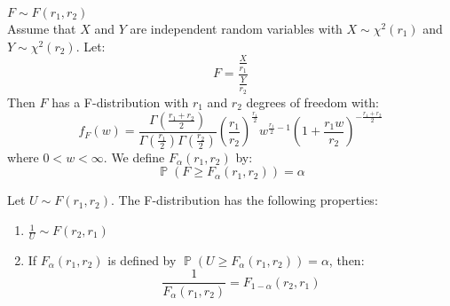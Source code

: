 \documentclass{huhtakm-template-book-v2}
\DeclareMathOperator{\prob}{\mathbb{P}}
\begin{document}
\newpage
\begin{eg} $F\sim F(r_{1},r_{2})$\\
	Assume that $X$ and $Y$ are independent random variables with $X\sim\chi^{2}(r_{1})$ and $Y\sim\chi^{2}(r_{2})$. Let:
	\begin{equation*}
		F=\frac{\frac{X}{r_{1}}}{\frac{Y}{r_{2}}}
	\end{equation*}
	Then $F$ has a F-distribution with $r_{1}$ and $r_{2}$ degrees of freedom with:
	\begin{equation*}
		f_{F}(w)=\frac{\Gamma\left(\frac{r_{1}+r_{2}}{2}\right)}{\Gamma\left(\frac{r_{1}}{2}\right)\Gamma\left(\frac{r_{2}}{2}\right)}\left(\frac{r_{1}}{r_{2}}\right)^{\frac{r_{1}}{2}}w^{\frac{r_{1}}{2}-1}\left(1+\frac{r_{1}w}{r_{2}}\right)^{-\frac{r_{1}+r_{2}}{2}}
	\end{equation*}
	where $0<w<\infty$. We define $F_{\alpha}(r_{1},r_{2})$ by:
	\begin{equation*}
		\prob(F\geq F_{\alpha}(r_{1},r_{2}))=\alpha
	\end{equation*}
\end{eg}
\begin{lem}
	Let $U\sim F(r_{1},r_{2})$. The F-distribution has the following properties:
	\begin{enumerate}
		\item $\frac{1}{U}\sim F(r_{2},r_{1})$
		\item If $F_{\alpha}(r_{1},r_{2})$ is defined by $\prob(U\geq F_{\alpha}(r_{1},r_{2}))=\alpha$, then:
		\begin{equation*}
			\frac{1}{F_{\alpha}(r_{1},r_{2})}=F_{1-\alpha}(r_{2},r_{1})
		\end{equation*}
	\end{enumerate}
\end{lem}
\end{document}

